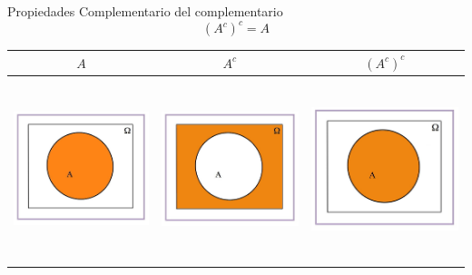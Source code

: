 \documentclass[
  ignorenonframetext,
]{beamer}
\begin{document}
\begin{frame}{Propiedades}
\protect\hypertarget{propiedades-3}{}
Complementario del complementario \[(A^c)^c=A\]

\begin{longtable}[]{@{}ccc@{}}
\toprule
\(A\) & \(A^c\) & \((A^c)^c\) \\
\midrule
\endhead
\includegraphics[width=\textwidth,height=2.08333in]{Images/proba1dibujos/dd2.jpg}
&
\includegraphics[width=\textwidth,height=2.08333in]{Images/proba1dibujos/dd1.jpg}
&
\includegraphics[width=\textwidth,height=2.08333in]{Images/proba1dibujos/dd3.jpg} \\
\bottomrule
\end{longtable}
\end{frame}
\end{document}
